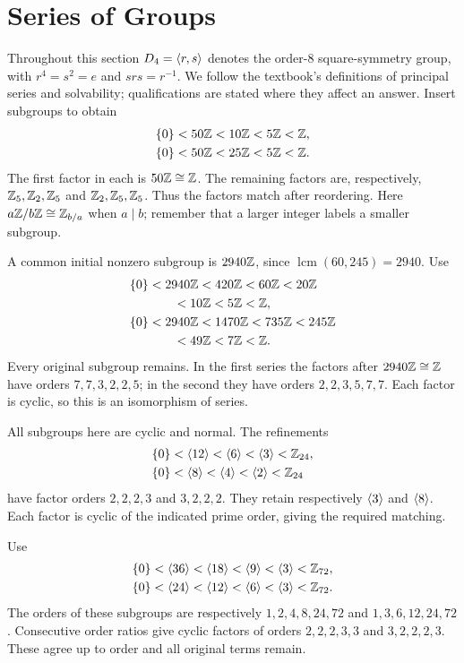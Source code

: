 \section{Series of Groups}
Throughout this section $D_4=\langle r,s\rangle$ denotes the order-8 square-symmetry group, with $r^4=s^2=e$ and $srs=r^{-1}$. We follow the textbook's definitions of principal series and solvability; qualifications are stated where they affect an answer.
Insert subgroups to obtain
\[
\begin{aligned}
\{0\}&<50\mathbb{Z}<10\mathbb{Z}<5\mathbb{Z}<\mathbb{Z},\\
\{0\}&<50\mathbb{Z}<25\mathbb{Z}<5\mathbb{Z}<\mathbb{Z}.
\end{aligned}
\]
The first factor in each is $50\mathbb{Z}\cong\mathbb{Z}$. The remaining factors are, respectively,
$\mathbb{Z}_5,\mathbb{Z}_2,\mathbb{Z}_5$ and $\mathbb{Z}_2,\mathbb{Z}_5,\mathbb{Z}_5$. Thus the factors match after reordering.
Here $a\mathbb{Z}/b\mathbb{Z}\cong\mathbb{Z}_{b/a}$ when $a\mid b$; remember that a larger integer labels a smaller subgroup.

A common initial nonzero subgroup is $2940\mathbb{Z}$, since $\operatorname{lcm}(60,245)=2940$. Use
\[
\begin{aligned}
\{0\}&<2940\mathbb{Z}<420\mathbb{Z}<60\mathbb{Z}<20\mathbb{Z}\\
&\hspace{2em}<10\mathbb{Z}<5\mathbb{Z}<\mathbb{Z},\\
\{0\}&<2940\mathbb{Z}<1470\mathbb{Z}<735\mathbb{Z}<245\mathbb{Z}\\
&\hspace{2em}<49\mathbb{Z}<7\mathbb{Z}<\mathbb{Z}.
\end{aligned}
\]
Every original subgroup remains. In the first series the factors after $2940\mathbb{Z}\cong\mathbb{Z}$ have orders $7,7,3,2,2,5$; in the second they have orders $2,2,3,5,7,7$. Each factor is cyclic, so this is an isomorphism of series.

All subgroups here are cyclic and normal. The refinements
\[
\begin{aligned}
\{0\}&<\langle 12\rangle<\langle 6\rangle<\langle 3\rangle<\mathbb{Z}_{24},\\
\{0\}&<\langle 8\rangle<\langle 4\rangle<\langle 2\rangle<\mathbb{Z}_{24}
\end{aligned}
\]
have factor orders $2,2,2,3$ and $3,2,2,2$. They retain respectively $\langle 3\rangle$ and $\langle 8\rangle$. Each factor is cyclic of the indicated prime order, giving the required matching.

Use
\[
\begin{aligned}
\{0\}&<\langle 36\rangle<\langle 18\rangle<\langle 9\rangle<\langle 3\rangle<\mathbb{Z}_{72},\\
\{0\}&<\langle 24\rangle<\langle 12\rangle<\langle 6\rangle<\langle 3\rangle<\mathbb{Z}_{72}.
\end{aligned}
\]
The orders of these subgroups are respectively $1,2,4,8,24,72$ and $1,3,6,12,24,72$.
Consecutive order ratios give cyclic factors of orders $2,2,2,3,3$ and $3,2,2,2,3$. These agree up to order and all original terms remain.

